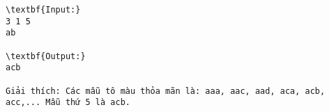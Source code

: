 \begin{verbatim}
\textbf{Input:}
3 1 5
ab

\textbf{Output:}
acb

Giải thích: Các mẫu tô màu thỏa mãn là: aaa, aac, aad, aca, acb, acc,... Mẫu thứ 5 là acb.
\end{verbatim}